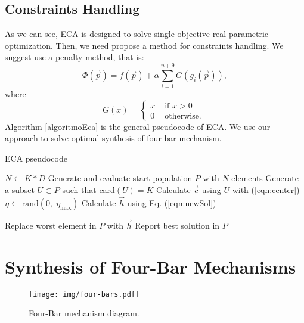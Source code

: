 \documentclass[12pt,letterpape]{article}
\begin{document}

\subsection{Constraints Handling} %
\label{sub:constraints_handling}

As we can see, ECA is designed to solve single-objective real-parametric optimization.
Then, we need propose a method for constraints handling. We suggest use a penalty
method, that is:
% 
\begin{equation}
	\Phi( \vec{p} ) = f( \vec{p} ) + \alpha \sum_{i=1}^{n+9} G(g_i( \vec{p} ) ),
% 
	\label{eqn:phiObj}
% 
\end{equation}
where 
$$
G(x) = 
\begin{cases}
	\displaystyle
	x & \text{ if } x > 0 \\
	0 & \text{ otherwise. }
\end{cases}
$$
% 
Algorithm \ref{algoritmoEca} is the general pseudocode of ECA. We use our approach
to solve optimal synthesis of four-bar mechanism.

\begin{algorithm}[!ht]
	\caption{ECA pseudocode}
	\label{algoritmoEca}
	\begin{algorithmic}[1]
		\State $N \gets K * D$
		\State Generate and evaluate start population $P$ with $N$ elements
				\State Generate a subset $U \subset P$ such that  card$(U) = K$
				\State Calculate $\vec{c}$ using $U$ with (\ref{eqn:center})
				\State $\eta \gets \text{rand}(0,\; \eta_{\max}) $ 
				\State Calculate $\vec{h}$ using Eq. (\ref{eqn:newSol})
				
					\State Replace worst element in $P$ with $\vec{h}$
				\EndIf
			\EndFor
		\EndWhile
		\State Report best solution in $P$
		\EndProcedure
	\end{algorithmic}
\end{algorithm}

\section{Synthesis of Four-Bar Mechanisms} %
\label{sec:synthesis_of_four_bar_mechanisms}

\begin{figure}[!ht]
	\centering
	\texttt{[image: img/four-bars.pdf]}
	\caption{Four-Bar mechanism diagram.}
	\label{fig:fourbar}
\end{figure}
\end{document}
